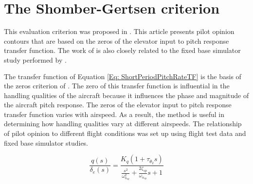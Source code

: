 \documentclass{report}
\begin{document}
\section{The Shomber-Gertsen criterion}\label{Sec: ShomberGertsenCriteria}

This evaluation criterion was proposed in \cite{ZeroGertsen}.  This article presents pilot opinion contours that are based on the zeros of the elevator input to pitch response transfer function.  The work of \cite{ZeroGertsen} is also closely related to the fixed base simulator study performed by \cite{ChalkLalpha}.   

The transfer function of Equation \ref{Eq: ShortPeriodPitchRateTF} is the basis of the zeros criterion of \cite{ZeroGertsen}.  The zero of this transfer function is influential in the handling qualities of the aircraft because it influences the phase and magnitude of the aircraft pitch response.  The zeros of the elevator input to pitch response transfer function varies with airspeed.  As a result, the method is useful in determining how handling qualities vary at different airspeeds.  The relationship of pilot opinion to different flight conditions was set up using flight test data and fixed base simulator studies.

\begin{equation}\label{Eq: ShortPeriodPitchRateTF}
	\frac{q(s)}{\delta_e (s)} = \frac{K_q (1 + \tau_{\theta_2}s)}{\frac{s^2}{\omega_{n_{sp}}^2} + \frac{2 \zeta_{sp}}{\omega_{n_{sp}}}s + 1}
\end{equation}


\end{document}

